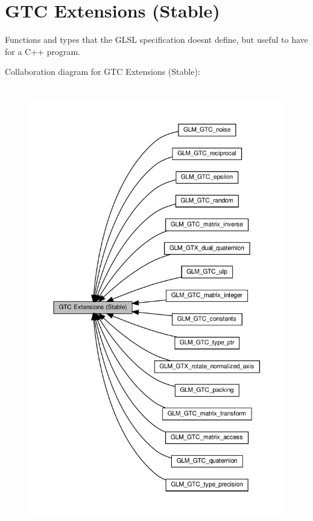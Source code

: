 \hypertarget{group__gtc}{}\section{G\+TC Extensions (Stable)}
\label{group__gtc}


Functions and types that the G\+L\+SL specification doesn\textquotesingle{}t define, but useful to have for a C++ program.  


Collaboration diagram for G\+TC Extensions (Stable)\+:\nopagebreak
\begin{figure}[H]
\begin{center}
\leavevmode
\includegraphics[height=550pt]{group__gtc}
\end{center}
\end{figure}
